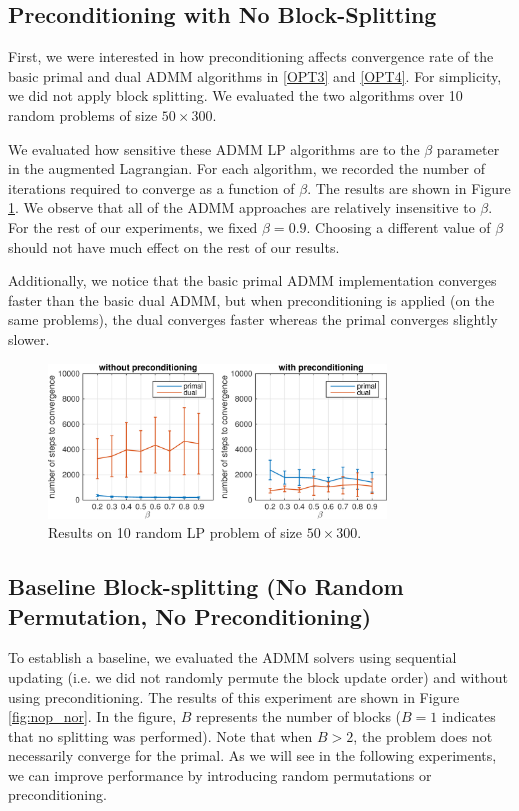 \documentclass{article}
\begin{document}
{\subsection*{Preconditioning with No Block-Splitting}

First, we were interested in how preconditioning affects convergence rate of the basic primal and dual ADMM algorithms in \eqref{OPT3} and \eqref{OPT4}. For simplicity, we did not apply block splitting. We evaluated the two algorithms over 10 random problems of size $50 \times 300$. 

We evaluated how sensitive these ADMM LP algorithms are to the $\beta$ parameter in the augmented Lagrangian. For each algorithm, we recorded the number of iterations required to converge as a function of $\beta$. The results  are shown in Figure \ref{fig:base_p_d}. We observe that all of the ADMM approaches are relatively insensitive to $\beta$. For the rest of our experiments, we fixed $\beta=0.9$. Choosing a different value of $\beta$ should not have much effect on the rest of our results. 

Additionally, we notice that the basic primal ADMM implementation converges faster than the basic dual ADMM, but when preconditioning is applied (on the same problems), the dual converges faster whereas the primal converges slightly slower. 
\newline
\newline
\newline
\begin{figure}[ht]
	\centering
	\includegraphics[width=0.8\textwidth]{../figures/primal_dual_preconditioning.png}
	\caption{Results on 10 random LP problem of size $50 \times 300$. }
	\label{fig:base_p_d}
\end{figure}
\newpage
\subsection*{Baseline Block-splitting (No Random Permutation, No Preconditioning)}
To establish a baseline, we evaluated the ADMM solvers using sequential updating (i.e. we did not randomly permute the block update order) and without using preconditioning. The results of this experiment are shown in Figure \ref{fig:nop_nor}. In the figure, $B$ represents the number of blocks ($B=1$ indicates that no splitting was performed). Note that when $B>2$, the problem does not necessarily converge for the primal. As we will see in the following experiments, we can improve performance by introducing random permutations or preconditioning.
\newline
\newline
\newline
\newline

}
\end{document}
